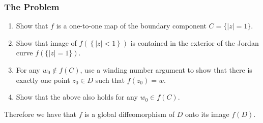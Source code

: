 \subsubsection*{The Problem}
\begin{enumerate}
\item Show that \(f\) is a one-to-one map of the boundary component \(C = \{|z| = 1\}\).
\item Show that image of \(f(\left\{|z| < 1\right\})\) is contained in the exterior of the Jordan curve
\(f(\{|z| = 1\})\).
\item For any \(w_0 \not \in f(C)\), use a winding number argument to show that there is exactly one point
\(z_0 \in D\) such that \(f(z_0) = w\).
\item Show that the above also holds for any \(w_0 \in f(C)\).
\end{enumerate}
Therefore we have that \(f\) is a global diffeomorphism of \(D\) onto its image \(f(D)\).

